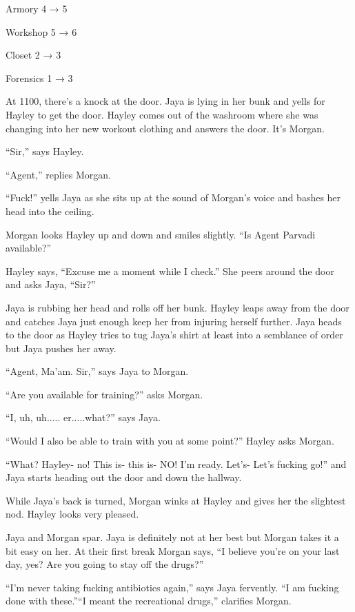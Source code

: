 Armory 4 →  5

Workshop 5 →  6

Closet 2 →  3

Forensics 1 →  3





At 1100, there's a knock at the door.  Jaya is lying in her bunk and yells for Hayley to get the door.  Hayley comes out of the washroom where she was changing into her new workout clothing and answers the door.  It's Morgan.

``Sir,'' says Hayley.

``Agent,'' replies Morgan.

``Fuck!'' yells Jaya as she sits up at the sound of Morgan's voice and bashes her head into the ceiling.

Morgan looks Hayley up and down and smiles slightly.  ``Is Agent Parvadi available?''

Hayley says, ``Excuse me a moment while I check.''  She peers around the door and asks Jaya, ``Sir?''

Jaya is rubbing her head and rolls off her bunk.  Hayley leaps away from the door and catches Jaya just enough keep her from injuring herself further.  Jaya heads to the door as Hayley tries to tug Jaya's shirt at least into a semblance of order but Jaya pushes her away. 

``Agent, Ma'am. Sir,'' says Jaya to Morgan.

``Are you available for training?'' asks Morgan.

``I, uh, uh..... er.....what?'' says Jaya.

``Would I also be able to train with you at some point?'' Hayley asks Morgan.

``What?  Hayley- no!  This is- this is- NO!   I'm ready.  Let's- Let's fucking go!'' and Jaya starts heading out the door and down the hallway.

While Jaya's back is turned, Morgan winks at Hayley and gives her the slightest nod.  Hayley looks very pleased.



Jaya and Morgan spar.  Jaya is definitely not at her best but Morgan takes it a bit easy on her.  At their first break Morgan says, ``I believe you're on your last day, yes?  Are you going to stay off the drugs?''

``I'm never taking fucking antibiotics again,'' says Jaya fervently.  ``I am fucking done with these.''``I meant the recreational drugs,'' clarifies Morgan.

